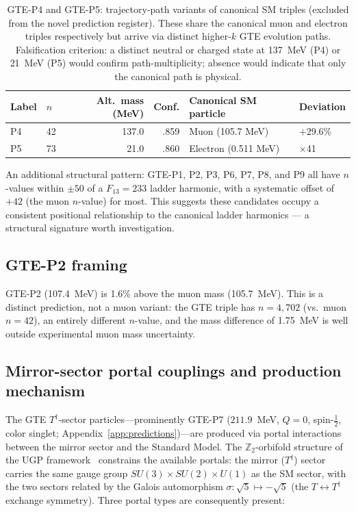 \documentclass[12pt]{article}
\numberwithin{equation}{section}
\begin{document}
\begin{table}[H]
\centering
\footnotesize
\setlength{\tabcolsep}{4pt}
\begin{tabular}{llrrll}
\toprule
Label & $n$ & Alt.\ mass (MeV) & Conf. & Canonical SM particle & Deviation \\
\midrule
P4 & 42 & 137.0 & .859 & Muon (105.7 MeV) & +29.6\% \\
P5 & 73 & 21.0 & .860 & Electron (0.511 MeV) & $\times$41 \\
\bottomrule
\end{tabular}
\caption{GTE-P4 and GTE-P5: trajectory-path variants of canonical SM triples (excluded from the novel prediction register). These share the canonical muon and electron triples respectively but arrive via distinct higher-$k$ GTE evolution paths. Falsification criterion: a distinct neutral or charged state at 137~MeV (P4) or 21~MeV (P5) would confirm path-multiplicity; absence would indicate that only the canonical path is physical.}
\label{tab:path-variants}
\end{table}

An additional structural pattern: GTE-P1, P2, P3, P6, P7, P8, and P9 all have $n$-values within $\pm 50$ of a $F_{13}=233$ ladder harmonic, with a systematic offset of $+42$ (the muon $n$-value) for most. This suggests these candidates occupy a consistent positional relationship to the canonical ladder harmonics --- a structural signature worth investigation.

\subsection{GTE-P2 framing}
\label{sec:p2-framing}

GTE-P2 (107.4~MeV) is 1.6\% above the muon mass (105.7~MeV). This is a distinct prediction, not a muon variant: the GTE triple has $n{=}4{,}702$ (vs.\ muon $n{=}42$), an entirely different $n$-value, and the mass difference of 1.75~MeV is well outside experimental muon mass uncertainty.

\subsection{Mirror-sector portal couplings and production mechanism}
\label{sec:portal-production}

The GTE $T^\dagger$-sector particles---prominently GTE-P7 ($211.9$~MeV, $Q=0$,
spin-$\frac{1}{2}$, color singlet; Appendix~\ref{app:predictions})---are produced
via portal interactions between the mirror sector and the Standard Model.
The $\mathbb{Z}_2$-orbifold structure of the UGP framework~\cite{SpivackDeeperTheory}
constrains the available portals: the mirror ($T^\dagger$) sector carries the same
gauge group $SU(3)\times SU(2)\times U(1)$ as the SM sector, with the two sectors
related by the Galois automorphism $\sigma:\sqrt{5}\mapsto -\sqrt{5}$
(the $T\leftrightarrow T^\dagger$ exchange symmetry).
Three portal types are consequently present:
\end{document}

